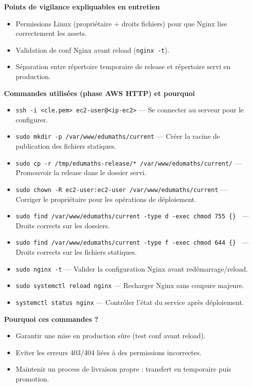\documentclass[10pt,a4paper]{article}
\begin{document}
\textbf{Points de vigilance expliquables en entretien}
\begin{itemize}
  \item Permissions Linux (propri\'etaire + droits fichiers) pour que Nginx lise correctement les assets.
  \item Validation de conf Nginx avant reload (\texttt{nginx -t}).
  \item S\'eparation entre r\'epertoire temporaire de release et r\'epertoire servi en production.
\end{itemize}

\textbf{Commandes utilis\'ees (phase AWS HTTP) et pourquoi}
\begin{itemize}
  \item \texttt{ssh -i <cle.pem> ec2-user@<ip-ec2>} --- Se connecter au serveur pour le configurer.
  \item \texttt{sudo mkdir -p /var/www/edumaths/current} --- Cr\'eer la racine de publication des fichiers statiques.
  \item \texttt{sudo cp -r /tmp/edumaths-release/* /var/www/edumaths/current/} --- Promouvoir la release dans le dossier servi.
  \item \texttt{sudo chown -R ec2-user:ec2-user /var/www/edumaths/current} --- Corriger le propri\'etaire pour les op\'erations de d\'eploiement.
  \item \texttt{sudo find /var/www/edumaths/current -type d -exec chmod 755 \{\} \;} --- Droits corrects sur les dossiers.
  \item \texttt{sudo find /var/www/edumaths/current -type f -exec chmod 644 \{\} \;} --- Droits corrects sur les fichiers statiques.
  \item \texttt{sudo nginx -t} --- Valider la configuration Nginx avant red\'emarrage/reload.
  \item \texttt{sudo systemctl reload nginx} --- Recharger Nginx sans coupure majeure.
  \item \texttt{systemctl status nginx} --- Contr\^oler l'\'etat du service apr\`es d\'eploiement.
\end{itemize}

\textbf{Pourquoi ces commandes ?}
\begin{itemize}
  \item Garantir une mise en production s\^ure (test conf avant reload).
  \item Eviter les erreurs 403/404 li\'ees \`a des permissions incorrectes.
  \item Maintenir un process de livraison propre : transfert en temporaire puis promotion.
\end{itemize}
\end{document}
